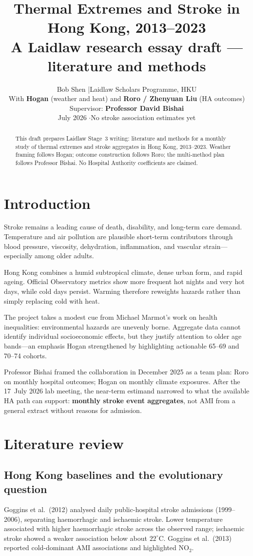\documentclass[11pt,a4paper]{article}
\title{\vspace{-1em}Thermal Extremes and Stroke in Hong Kong, 2013--2023\\[0.35em]
\large A Laidlaw research essay draft --- literature and methods}
\author{Bob Shen \quad|\quad Laidlaw Scholars Programme, HKU\\[0.2em]
\small With \textbf{Hogan} (weather and heat) and \textbf{Roro / Zhenyuan Liu} (HA outcomes)\\
\small Supervisor: \textbf{Professor David Bishai}\\[0.3em]
\small July 2026 \quad$\cdot$\quad No stroke association estimates yet}
\date{}
\begin{document}
\maketitle
\vspace{-1.2em}

\begin{abstract}
\noindent This draft prepares Laidlaw Stage~3 writing: literature and methods for a monthly study of thermal extremes and stroke aggregates in Hong Kong, 2013--2023. Weather framing follows Hogan; outcome construction follows Roro; the multi-method plan follows Professor Bishai. No Hospital Authority coefficients are claimed.
\end{abstract}

\section{Introduction}
Stroke remains a leading cause of death, disability, and long-term care demand. Temperature and air pollution are plausible short-term contributors through blood pressure, viscosity, dehydration, inflammation, and vascular strain---especially among older adults.

Hong Kong combines a humid subtropical climate, dense urban form, and rapid ageing. Official Observatory metrics show more frequent hot nights and very hot days, while cold days persist. Warming therefore reweights hazards rather than simply replacing cold with heat.

The project takes a modest cue from Michael Marmot's work on health inequalities: environmental hazards are unevenly borne. Aggregate data cannot identify individual socioeconomic effects, but they justify attention to older age bands---an emphasis Hogan strengthened by highlighting actionable 65--69 and 70--74 cohorts.

Professor Bishai framed the collaboration in December 2025 as a team plan: Roro on monthly hospital outcomes; Hogan on monthly climate exposures. After the 17~July 2026 lab meeting, the near-term estimand narrowed to what the available HA path can support: \textbf{monthly stroke event aggregates}, not AMI from a general extract without reasons for admission.

\section{Literature review}

\subsection{Hong Kong baselines and the evolutionary question}
Goggins et al.\ (2012) analysed daily public-hospital stroke admissions (1999--2006), separating haemorrhagic and ischaemic stroke. Lower temperature associated with higher haemorrhagic stroke across the observed range; ischaemic stroke showed a weaker association below about $22^\circ$C. Goggins et al.\ (2013) reported cold-dominant AMI associations and highlighted NO$_2$.
\end{document}
